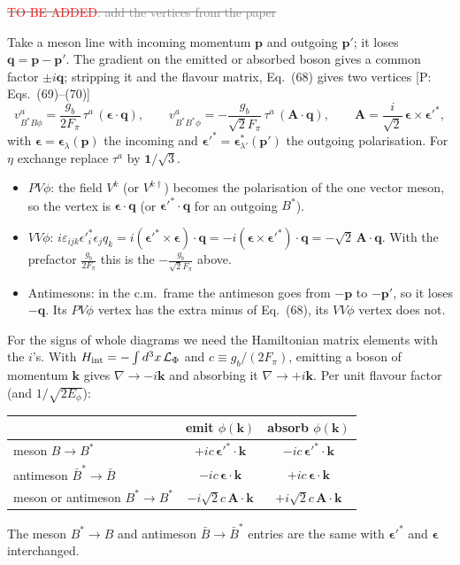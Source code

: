 \documentclass[11pt]{article}
\newcommand{\todo}{\textcolor{red}{TO BE ADDED}}
\newcommand{\tagP}[1]{\textcolor{blue!65!black}{\textsf{\small[P:\,#1]}}}
\newcommand{\aifix}[2]{\textcolor{gray}{\sout{#1}} \textcolor{aicolor}{#2}}
\newcommand{\aifix}[2]{#2}
\newenvironment{aiadd}{\par}{\par}
\begin{document}
\aifix{\todo: add the vertices from the paper}{}

\begin{aiadd}
	Take a meson line with incoming momentum $\bm p$ and outgoing $\bm p'$; it loses $\bm q=\bm p-\bm p'$. The gradient on the emitted or absorbed boson gives a common factor $\pm i\bm q$; stripping it and the flavour matrix, Eq.~(68) gives two vertices \tagP{Eqs.~(69)--(70)}
	\[
		v^a_{B^*B\phi}=\frac{g_b}{2F_\pi}\,\tau^a\,(\bm\epsilon\cdot\bm q),\qquad
		v^a_{B^*B^*\phi}=-\frac{g_b}{\sqrt2F_\pi}\,\tau^a\,(\bm A\cdot\bm q),\qquad
		\bm A=\frac{i}{\sqrt2}\,\bm\epsilon\times\bm\epsilon'^*,
	\]
	with $\bm\epsilon=\bm\epsilon_\lambda(\bm p)$ the incoming and $\bm\epsilon'^*=\bm\epsilon^*_{\lambda'}(\bm p')$ the outgoing polarisation. For $\eta$ exchange replace $\tau^a$ by $\bm 1/\sqrt3$.
	\begin{itemize}
		\item $PV\phi$: the field $V^k$ (or $V^{k\dagger}$) becomes the polarisation of the one vector meson, so the vertex is $\bm\epsilon\cdot\bm q$ (or $\bm\epsilon'^*\cdot\bm q$ for an outgoing $B^*$).
		\item $VV\phi$: $i\varepsilon_{ijk}\epsilon'^*_i\epsilon_jq_k=i(\bm\epsilon'^*\times\bm\epsilon)\cdot\bm q=-i(\bm\epsilon\times\bm\epsilon'^*)\cdot\bm q=-\sqrt2\,\bm A\cdot\bm q$. With the prefactor $\frac{g_b}{2F_\pi}$ this is the $-\frac{g_b}{\sqrt2F_\pi}$ above.
		\item Antimesons: in the c.m.\ frame the antimeson goes from $-\bm p$ to $-\bm p'$, so it loses $-\bm q$. Its $PV\phi$ vertex has the extra minus of Eq.~(68), its $VV\phi$ vertex does not.
	\end{itemize}
	For the signs of whole diagrams we need the Hamiltonian matrix elements with the $i$'s. With $H_{\rm int}=-\int d^3x\,\mathcal L_\Phi$ and $c\equiv g_b/(2F_\pi)$, emitting a boson of momentum $\bm k$ gives $\nabla\to-i\bm k$ and absorbing it $\nabla\to+i\bm k$. Per unit flavour factor (and $1/\sqrt{2E_\phi}$):
	\begin{center}
		\begin{tabular}{lcc}
			                                & emit $\phi(\bm k)$              & absorb $\phi(\bm k)$            \\ \hline
			meson $B\to B^*$                & $+ic\,\bm\epsilon'^*\cdot\bm k$ & $-ic\,\bm\epsilon'^*\cdot\bm k$ \\
			antimeson $\bar B^*\to\bar B$   & $-ic\,\bm\epsilon\cdot\bm k$    & $+ic\,\bm\epsilon\cdot\bm k$    \\
			meson or antimeson $B^*\to B^*$ & $-i\sqrt2c\,\bm A\cdot\bm k$    & $+i\sqrt2c\,\bm A\cdot\bm k$
		\end{tabular}
	\end{center}
	The meson $B^*\to B$ and antimeson $\bar B\to\bar B^*$ entries are the same with $\bm\epsilon'^*$ and $\bm\epsilon$ interchanged.
\end{aiadd}
\end{document}
